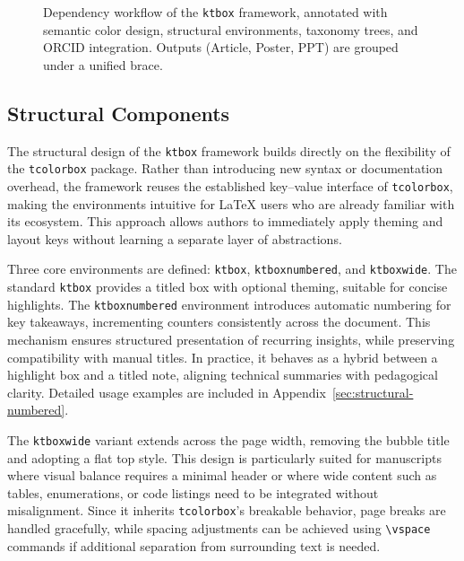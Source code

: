 \documentclass[12pt,onecolumn]{article}
\begin{document}
\begin{figure}[t]
{}
  \caption[ktbox framework workflow]{Dependency workflow of the \texttt{ktbox} framework, annotated with semantic color design, structural environments, taxonomy trees, and ORCID integration. Outputs (Article, Poster, PPT) are grouped under a unified brace.}
\end{figure}


\subsection{Structural Components}
\label{sec:structural-components}
  The structural design of the \texttt{ktbox} framework builds directly on the flexibility of the \texttt{tcolorbox} package. Rather than introducing new syntax or documentation overhead, the framework reuses the established key–value interface of \texttt{tcolorbox}, making the environments intuitive for LaTeX users who are already familiar with its ecosystem. This approach allows authors to immediately apply theming and layout keys without learning a separate layer of abstractions.

  Three core environments are defined: \texttt{ktbox}, \texttt{ktboxnumbered}, and \texttt{ktboxwide}. The standard \texttt{ktbox} provides a titled box with optional theming, suitable for concise highlights. The \texttt{ktboxnumbered} environment introduces automatic numbering for key takeaways, incrementing counters consistently across the document. This mechanism ensures structured presentation of recurring insights, while preserving compatibility with manual titles. In practice, it behaves as a hybrid between a highlight box and a titled note, aligning technical summaries with pedagogical clarity. Detailed usage examples are included in Appendix~\ref{sec:structural-numbered}.

  The \texttt{ktboxwide} variant extends across the page width, removing the bubble title and adopting a flat top style. This design is particularly suited for manuscripts where visual balance requires a minimal header or where wide content such as tables, enumerations, or code listings need to be integrated without misalignment. Since it inherits \texttt{tcolorbox}’s breakable behavior, page breaks are handled gracefully, while spacing adjustments can be achieved using \verb|\vspace| commands if additional separation from surrounding text is needed.
\end{document}
